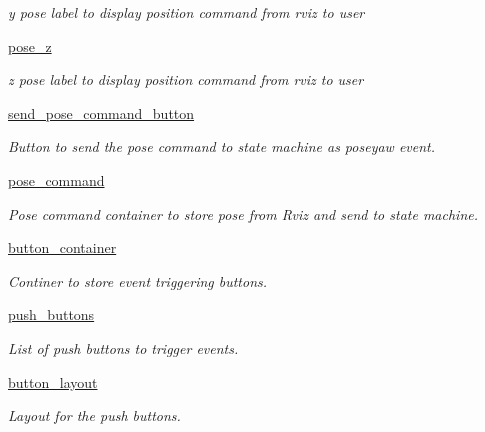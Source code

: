 \begin{DoxyCompactItemize}
\begin{DoxyCompactList}\small\item\em y pose label to display position command from rviz to user \end{DoxyCompactList}\item 
\hyperlink{classaerial__autonomy_1_1aerial__autonomy__gui_1_1EventTransmissionGUI_aead4d11a8fe43596a7077554542af0d2}{pose\-\_\-z}
\begin{DoxyCompactList}\small\item\em z pose label to display position command from rviz to user \end{DoxyCompactList}\item 
\hyperlink{classaerial__autonomy_1_1aerial__autonomy__gui_1_1EventTransmissionGUI_aa82ebdb0e64df86776b6cd9aacecb350}{send\-\_\-pose\-\_\-command\-\_\-button}
\begin{DoxyCompactList}\small\item\em Button to send the pose command to state machine as poseyaw event. \end{DoxyCompactList}\item 
\hyperlink{classaerial__autonomy_1_1aerial__autonomy__gui_1_1EventTransmissionGUI_acedbac17d93e4e743b8bef847720659f}{pose\-\_\-command}
\begin{DoxyCompactList}\small\item\em Pose command container to store pose from Rviz and send to state machine. \end{DoxyCompactList}\item 
\hyperlink{classaerial__autonomy_1_1aerial__autonomy__gui_1_1EventTransmissionGUI_a21ccb12c6c1d93f2d70ccca1c741ec73}{button\-\_\-container}
\begin{DoxyCompactList}\small\item\em Continer to store event triggering buttons. \end{DoxyCompactList}\item 
\hyperlink{classaerial__autonomy_1_1aerial__autonomy__gui_1_1EventTransmissionGUI_a9b589c667ce4f5719c5bb0ddbdb0fd42}{push\-\_\-buttons}
\begin{DoxyCompactList}\small\item\em List of push buttons to trigger events. \end{DoxyCompactList}\item 
\hyperlink{classaerial__autonomy_1_1aerial__autonomy__gui_1_1EventTransmissionGUI_a1a4f6c154f52187c5b6206cb327b1ebc}{button\-\_\-layout}
\begin{DoxyCompactList}\small\item\em Layout for the push buttons. \end{DoxyCompactList}\end{DoxyCompactItemize}


